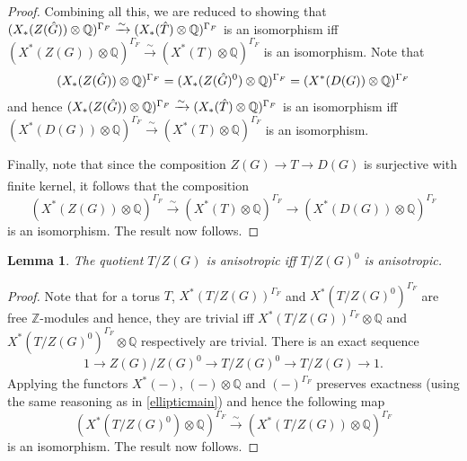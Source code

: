 \documentclass[11pt,a4paper]{article}
\theoremstyle{definition}
\theoremstyle{plain}
\newtheorem{Le}[shared]{Lemma}
\theoremstyle{remark}
\theoremstyle{plain}
\begin{document}
\begin{proof}
    Combining all this, we are reduced to showing that $(X_*(Z(\Hat{G}))\otimes \mathbb{Q})^{\Gamma_F} \xrightarrow[]{\sim} (X_*(\Hat{T})\otimes \mathbb{Q})^{\Gamma_F}$ is an isomorphism iff $(X^*(Z(G))\otimes \mathbb{Q})^{\Gamma_F} \xrightarrow[]{\sim} (X^*(T) \otimes \mathbb{Q})^{\Gamma_F}$ is an isomorphism. Note that 
    $$(X_*(Z(\Hat{G}))\otimes \mathbb{Q})^{\Gamma_F} = (X_*(Z(\Hat{G})^0)\otimes \mathbb{Q})^{\Gamma_F} = (X^*(D(G))\otimes \mathbb{Q})^{\Gamma_F}$$
    and hence $(X_*(Z(\Hat{G}))\otimes \mathbb{Q})^{\Gamma_F} \xrightarrow[]{\sim} (X_*(\Hat{T})\otimes \mathbb{Q})^{\Gamma_F}$ is an isomorphism iff $(X^*(D(G))\otimes \mathbb{Q})^{\Gamma_F} \xrightarrow[]{\sim} (X^*(T)\otimes \mathbb{Q})^{\Gamma_F}$ is an isomorphism.

    Finally, note that since the composition $Z(G) \xrightarrow[]{} T \xrightarrow[]{} D(G)$ is surjective with finite kernel, it follows that the composition
    $$(X^*(Z(G))\otimes \mathbb{Q})^{\Gamma_F} \xrightarrow[]{\sim} (X^*(T) \otimes \mathbb{Q})^{\Gamma_F} \xrightarrow[]{} (X^*(D(G))\otimes \mathbb{Q})^{\Gamma_F}$$
    is an isomorphism. The result now follows.
\end{proof}

\begin{Le}\label{ellipticlem1}
    The quotient $T/ Z(G)$ is anisotropic iff $T/Z(G)^0$ is anisotropic.
\end{Le}
\begin{proof}
    Note that for a torus $T$, $X^*(T/Z(G))^{\Gamma_F}$ and $X^*(T/Z(G)^0)^{\Gamma_F}$ are free $\mathbb{Z}$-modules and hence, they are trivial iff $X^*(T/Z(G))^{\Gamma_F} \otimes \mathbb{Q}$ and $X^*(T/Z(G)^0)^{\Gamma_F} \otimes \mathbb{Q}$ respectively are trivial. There is an exact sequence
    $$ 1 \xrightarrow[]{} Z(G)/Z(G)^0 \xrightarrow[]{} T/Z(G)^0 \xrightarrow[]{} T/Z(G) \xrightarrow[]{} 1.$$
    Applying the functors $X^*(-)$, $(-) \otimes \mathbb{Q}$ and $(-)^{\Gamma_F}$ preserves exactness (using the same reasoning as in \ref{ellipticmain}) and hence the following map
    $$ (X^*(T/Z(G)^0) \otimes \mathbb{Q})^{\Gamma_F} \xrightarrow[]{\sim} (X^*(T/Z(G)) \otimes \mathbb{Q})^{\Gamma_F} $$
    is an isomorphism. The result now follows.
\end{proof}
\end{document}
